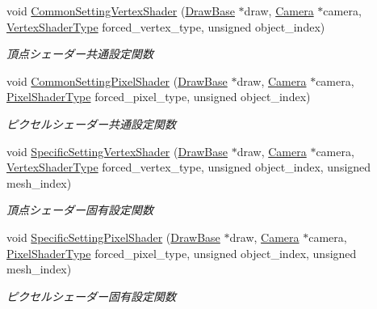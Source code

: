 \begin{DoxyCompactItemize}
void \mbox{\hyperlink{class_shader_manager_a836c92ee48dfbf8b8c8085f9413027bd}{Common\+Setting\+Vertex\+Shader}} (\mbox{\hyperlink{class_draw_base}{Draw\+Base}} $\ast$draw, \mbox{\hyperlink{class_camera}{Camera}} $\ast$camera, \mbox{\hyperlink{class_shader_manager_a9b51e49d70eb3cc58f6d1f3994e8cfbd}{Vertex\+Shader\+Type}} forced\+\_\+vertex\+\_\+type, unsigned object\+\_\+index)
\begin{DoxyCompactList}\small\item\em 頂点シェーダー共通設定関数 \end{DoxyCompactList}\item 
void \mbox{\hyperlink{class_shader_manager_ad2b591958e1d22d746e5ed3d7941e4c1}{Common\+Setting\+Pixel\+Shader}} (\mbox{\hyperlink{class_draw_base}{Draw\+Base}} $\ast$draw, \mbox{\hyperlink{class_camera}{Camera}} $\ast$camera, \mbox{\hyperlink{class_shader_manager_a7d15d773b3c6a99dd7086c45c8b0be5f}{Pixel\+Shader\+Type}} forced\+\_\+pixel\+\_\+type, unsigned object\+\_\+index)
\begin{DoxyCompactList}\small\item\em ピクセルシェーダー共通設定関数 \end{DoxyCompactList}\item 
void \mbox{\hyperlink{class_shader_manager_a2433c0715142fd310a497e080f7d0ddb}{Specific\+Setting\+Vertex\+Shader}} (\mbox{\hyperlink{class_draw_base}{Draw\+Base}} $\ast$draw, \mbox{\hyperlink{class_camera}{Camera}} $\ast$camera, \mbox{\hyperlink{class_shader_manager_a9b51e49d70eb3cc58f6d1f3994e8cfbd}{Vertex\+Shader\+Type}} forced\+\_\+vertex\+\_\+type, unsigned object\+\_\+index, unsigned mesh\+\_\+index)
\begin{DoxyCompactList}\small\item\em 頂点シェーダー固有設定関数 \end{DoxyCompactList}\item 
void \mbox{\hyperlink{class_shader_manager_a1158156785098fe426dd514e4c2a97c1}{Specific\+Setting\+Pixel\+Shader}} (\mbox{\hyperlink{class_draw_base}{Draw\+Base}} $\ast$draw, \mbox{\hyperlink{class_camera}{Camera}} $\ast$camera, \mbox{\hyperlink{class_shader_manager_a7d15d773b3c6a99dd7086c45c8b0be5f}{Pixel\+Shader\+Type}} forced\+\_\+pixel\+\_\+type, unsigned object\+\_\+index, unsigned mesh\+\_\+index)
\begin{DoxyCompactList}\small\item\em ピクセルシェーダー固有設定関数 \end{DoxyCompactList}\end{DoxyCompactItemize}
